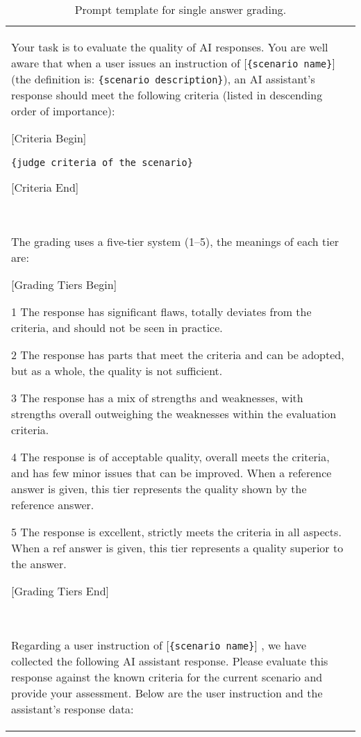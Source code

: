\begin{table}[tbh!]
  \caption{Prompt template for single answer grading.}
  \label{tab:prompt}
  \small
  \begin{tabularx}{.48\textwidth}{X}
    \toprule
        Your task is to evaluate the quality of AI responses. You are well aware that when a user issues an instruction of [\texttt{\{scenario name\}}] (the definition is: \texttt{\{scenario description\}}), an AI assistant's response should meet the following criteria (listed in descending order of importance): 
        
        [Criteria Begin] 
        
        \texttt{\{judge criteria of the scenario\}} 
        
        [Criteria End] 

        \ 
        
        The grading uses a five-tier system (1--5), the meanings of each tier are: 
        
        [Grading Tiers Begin] 
        
        1 The response has significant flaws, totally deviates from the criteria, and should not be seen in practice. 
        
        2 The response has parts that meet the criteria and can be adopted, but as a whole, the quality is not sufficient. 
        
        3 The response has a mix of strengths and weaknesses, with strengths overall outweighing the weaknesses within the evaluation criteria. 
        
        4 The response is of acceptable quality, overall meets the criteria, and has few minor issues that can be improved. When a reference answer is given, this tier represents the quality shown by the reference answer. 
        
        5 The response is excellent, strictly meets the criteria in all aspects. When a ref answer is given, this tier represents a quality superior to the answer. 
        
        [Grading Tiers End] 

        \
        
        Regarding a user instruction of [\texttt{\{scenario name\}}] , we have collected the following AI assistant response. Please evaluate this response against the known criteria for the current scenario and provide your assessment. Below are the user instruction and the assistant's response data: 
        

\end{tabularx}
\end{table}
